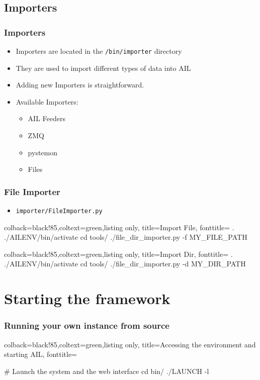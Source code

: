 \documentclass[aspectratio=169]{beamer}
\begin{document}
\subsection{Importers}

\begin{frame}
    \frametitle{Importers}
    \begin{itemize}
        \item Importers are located in the \texttt{/bin/importer} directory
        \item They are used to import different types of data into AIL
        \item Adding new Importers is straightforward.
        \item Available Importers:
            \begin{itemize}
                \item AIL Feeders
                \item ZMQ
                \item pystemon
                \item Files
            \end{itemize}
    \end{itemize}
\end{frame}


\lstset{style=bash}
\begin{frame}[fragile]
    \frametitle{File Importer}
    \begin{itemize}
        \item \texttt{importer/FileImporter.py}
    \end{itemize}
    \begin{tcblisting}{colback=black!85,coltext=green,listing only,
        title=Import File, fonttitle=\bfseries}
. ./AILENV/bin/activate
cd tools/
./file_dir_importer.py -f MY_FILE_PATH
    \end{tcblisting}
    \begin{tcblisting}{colback=black!85,coltext=green,listing only,
        title=Import Dir, fonttitle=\bfseries}
. ./AILENV/bin/activate
cd tools/
./file_dir_importer.py -d MY_DIR_PATH
    \end{tcblisting}
\end{frame}




\section{Starting the framework}
\lstset{style=bash}
\begin{frame}[fragile]
    \frametitle{Running your own instance from source}
    \begin{tcblisting}{colback=black!85,coltext=green,listing only,
        title=Accessing the environment and starting AIL, fonttitle=\bfseries}

# Launch the system and the web interface
cd bin/
./LAUNCH -l

\end{tcblisting}
\end{frame}
\end{document}
